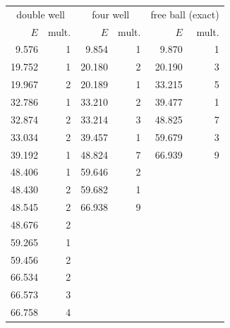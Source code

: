 \begin{tabular}{rrrrrr}
\toprule
\multicolumn{2}{c}{double well} & \multicolumn{2}{c}{four well} & \multicolumn{2}{c}{free ball (exact)} \\
$E$ & mult. & $E$ & mult. & $E$ & mult. \\
\midrule
9.576 & 1 & 9.854 & 1 & 9.870 & 1 \\
19.752 & 1 & 20.180 & 2 & 20.190 & 3 \\
19.967 & 2 & 20.189 & 1 & 33.215 & 5 \\
32.786 & 1 & 33.210 & 2 & 39.477 & 1 \\
32.874 & 2 & 33.214 & 3 & 48.825 & 7 \\
33.034 & 2 & 39.457 & 1 & 59.679 & 3 \\
39.192 & 1 & 48.824 & 7 & 66.939 & 9 \\
48.406 & 1 & 59.646 & 2 &  &  \\
48.430 & 2 & 59.682 & 1 &  &  \\
48.545 & 2 & 66.938 & 9 &  &  \\
48.676 & 2 &  &  &  &  \\
59.265 & 1 &  &  &  &  \\
59.456 & 2 &  &  &  &  \\
66.534 & 2 &  &  &  &  \\
66.573 & 3 &  &  &  &  \\
66.758 & 4 &  &  &  &  \\
\bottomrule
\end{tabular}

